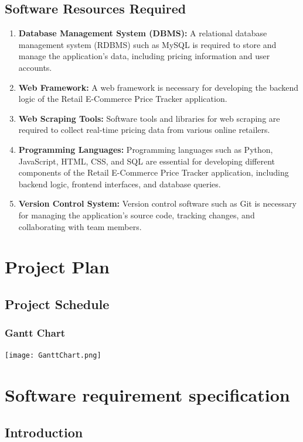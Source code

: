 \documentclass[a4paper,14pt,onecolumn]{report}
\begin{document}
	\section{Software Resources Required}
	\begin{enumerate}
		\item \textbf{Database Management System (DBMS):} A relational database management system (RDBMS) such as MySQL is required to store and manage the application's data, including pricing information and user accounts. 
		
		\item \textbf{Web Framework:} A web framework is necessary for developing the backend logic of the Retail E-Commerce Price Tracker application.
		
		\item \textbf{Web Scraping Tools:} Software tools and libraries for web scraping are required to collect real-time pricing data from various online retailers.
		
		\item \textbf{Programming Languages:} Programming languages such as Python, JavaScript, HTML, CSS, and SQL are essential for developing different components of the Retail E-Commerce Price Tracker application, including backend logic, frontend interfaces, and database queries.
		
		\item \textbf{Version Control System:} Version control software such as Git is necessary for managing the application's source code, tracking changes, and collaborating with team members.
	\end{enumerate}
	\newpage
	\chapter{Project Plan}
	\section{Project Schedule}  
	\subsection{Gantt Chart}  
	\texttt{[image: GanttChart.png]}
	
	\chapter{Software requirement specification}
	
	\section{Introduction}
\end{document}
